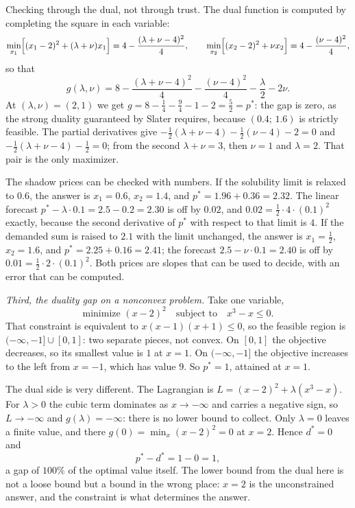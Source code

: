 Checking through the dual, not through trust. The dual function is computed by completing the
square in each variable:
\[
  \min_{x_{1}}\Bigl[(x_{1}-2)^{2}+(\lambda+\nu)x_{1}\Bigr]
  =4-\frac{(\lambda+\nu-4)^{2}}{4},
  \qquad
  \min_{x_{2}}\Bigl[(x_{2}-2)^{2}+\nu x_{2}\Bigr]
  =4-\frac{(\nu-4)^{2}}{4},
\]
so that
\[
  g(\lambda,\nu)=8-\frac{(\lambda+\nu-4)^{2}}{4}-\frac{(\nu-4)^{2}}{4}
  -\frac{\lambda}{2}-2\nu .
\]
At $(\lambda,\nu)=(2,1)$ we get $g=8-\tfrac14-\tfrac94-1-2=\tfrac52=p^{*}$: the gap is zero, as
the strong duality guaranteed by Slater requires, because $(0.4;\,1.6)$ is strictly feasible.
The partial derivatives give $-\tfrac12(\lambda+\nu-4)-\tfrac12(\nu-4)-2=0$ and
$-\tfrac12(\lambda+\nu-4)-\tfrac12=0$; from the second $\lambda+\nu=3$, then $\nu=1$ and
$\lambda=2$. That pair is the only maximizer.

The shadow prices can be checked with numbers. If the solubility limit is relaxed to $0.6$, the
answer is $x_{1}=0.6$, $x_{2}=1.4$, and $p^{*}=1.96+0.36=2.32$. The linear forecast
$p^{*}-\lambda\cdot0.1=2.5-0.2=2.30$ is off by $0.02$, and $0.02=\tfrac12\cdot4\cdot(0.1)^{2}$
exactly, because the second derivative of $p^{*}$ with respect to that limit is $4$. If the
demanded sum is raised to $2.1$ with the limit unchanged, the answer is $x_{1}=\tfrac12$,
$x_{2}=1.6$, and $p^{*}=2.25+0.16=2.41$; the forecast $2.5-\nu\cdot0.1=2.40$ is off by
$0.01=\tfrac12\cdot2\cdot(0.1)^{2}$. Both prices are slopes that can be used to decide, with an
error that can be computed.

\emph{Third, the duality gap on a nonconvex problem.} Take one variable,
\[
  \text{minimize } (x-2)^{2}\quad\text{subject to}\quad x^{3}-x\le0 .
\]
That constraint is equivalent to $x(x-1)(x+1)\le0$, so the feasible region is
$(-\infty,-1]\cup[0,1]$: two separate pieces, not convex. On $[0,1]$ the objective decreases,
so its smallest value is $1$ at $x=1$. On $(-\infty,-1]$ the objective increases to the left
from $x=-1$, which has value $9$. So $p^{*}=1$, attained at $x=1$.

The dual side is very different. The Lagrangian is $L=(x-2)^{2}+\lambda(x^{3}-x)$. For
$\lambda>0$ the cubic term dominates as $x\to-\infty$ and carries a negative sign, so
$L\to-\infty$ and $g(\lambda)=-\infty$: there is no lower bound to collect. Only $\lambda=0$
leaves a finite value, and there $g(0)=\min_{x}(x-2)^{2}=0$ at $x=2$. Hence $d^{*}=0$ and
\[
  p^{*}-d^{*}=1-0=1 ,
\]
a gap of $100\%$ of the optimal value itself. The lower bound from the dual here is not a loose
bound but a bound in the wrong place: $x=2$ is the unconstrained answer, and the constraint is
what determines the answer.

